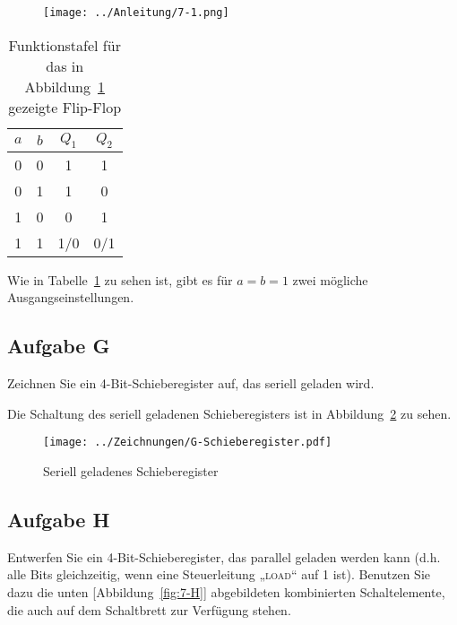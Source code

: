 \begin{figure}[htbp]
    \centering
    \texttt{[image: ../Anleitung/7-1.png]}
    \caption{%
		\cite[Abbildung~7.1]{physik313-Anleitung}
    }
    \label{fig:7-1}
\end{figure}

\begin{table}[htbp]
    \centering
    \begin{tabular}{cc|cc}
        $a$ & $b$ & $Q_1$ & $Q_2$ \\
        \hline
        0 & 0 & 1 & 1 \\
        0 & 1 & 1 & 0 \\
        1 & 0 & 0 & 1 \\
        1 & 1 & 1/0 & 0/1
    \end{tabular}
    \caption{%
        Funktionstafel für das in Abbildung~\ref{fig:7-1} gezeigte Flip-Flop 
    }
    \label{tab:Aufgabe_F}
\end{table}

Wie in Tabelle~\ref{tab:Aufgabe_F} zu sehen ist, gibt es für $a = b = 1$ zwei
mögliche Ausgangseinstellungen.

\FloatBarrier
\subsection{Aufgabe G}

\begin{problem}
    Zeichnen Sie ein 4-Bit-Schieberegister auf, das seriell geladen wird.
\end{problem}

Die Schaltung des seriell geladenen Schieberegisters ist in
Abbildung~\ref{fig:G-Schieberegister} zu sehen.

\begin{figure}[htbp]
    \centering
    \texttt{[image: ../Zeichnungen/G-Schieberegister.pdf]}
    \caption{%
        Seriell geladenes Schieberegister
    }
    \label{fig:G-Schieberegister}
\end{figure}

\FloatBarrier
\subsection{Aufgabe H}

\begin{problem}
    Entwerfen Sie ein 4-Bit-Schieberegister, das parallel geladen werden kann
    (d.h. alle Bits gleichzeitig, wenn eine Steuerleitung „\textsc{load}“ auf 1
    ist). Benutzen Sie dazu die unten [Abbildung~\ref{fig:7-H}] abgebildeten
    kombinierten Schaltelemente, die auch auf dem Schaltbrett zur Verfügung
    stehen.
\end{problem}

